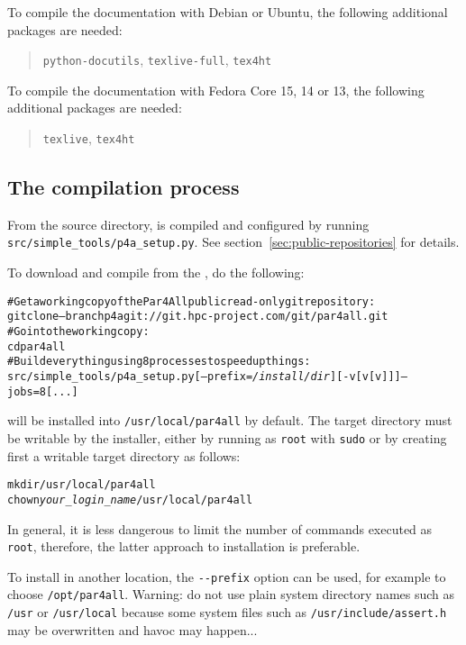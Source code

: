 \documentclass[a4paper]{article}
\begin{document}

To compile the documentation with Debian or Ubuntu, the following
additional packages are needed:
\begin{quote}
  \texttt{python-docutils}, \texttt{texlive-full}, \texttt{tex4ht}
\end{quote}

To compile the documentation with Fedora Core 15, 14 or 13, the following
additional packages are needed:
\begin{quote}
  \texttt{texlive}, \texttt{tex4ht}
\end{quote}

\subsection{The compilation process}
\label{sec:compilation-process}

From the \Apfa source directory, \Apfa is compiled and configured
by running \verb|src/simple_tools/p4a_setup.py|. See
section~\ref{sec:public-repositories} for details.

To download and compile \Apfa from the \Agit, do the following:
\begin{alltt}
# Get a working copy of the Par4All public read-only git repository:
git clone --branch p4a git://git.hpc-project.com/git/par4all.git
# Go into the working copy:
cd par4all
# Build everything using 8 processes to speed up things:
src/simple_tools/p4a_setup.py [--prefix=\emph{/install/dir}] [-v[v[v]]] --jobs=8 [...]
\end{alltt}%
\Apfa will be installed into \verb|/usr/local/par4all| by default.
The target directory must be writable by the installer, either by running
as \texttt{root} with \texttt{sudo} or by creating first a
writable target directory as follows:
\begin{alltt}
mkdir /usr/local/par4all
chown \emph{your_login_name} /usr/local/par4all
\end{alltt}
In general, it is less dangerous to limit the number of commands
executed as \texttt{root}, therefore, the latter approach to \Apfa
installation is preferable.

To install in another location, the \verb|--prefix| option can be used,
for example to choose \texttt{/opt/par4all}. Warning: do not use plain
system directory names such as \texttt{/usr} or \texttt{/usr/local}
because some system files such as \texttt{/usr/include/assert.h} may be
overwritten and havoc may happen...
\end{document}
